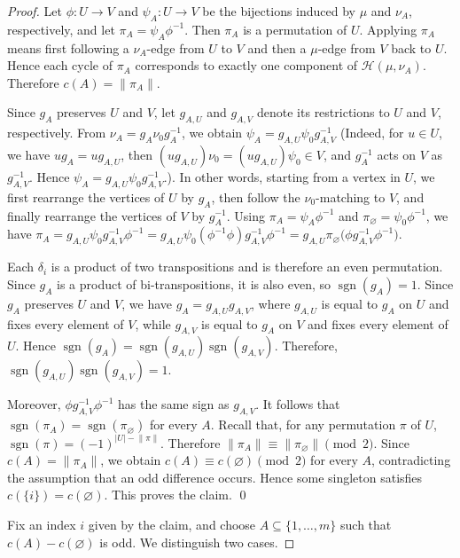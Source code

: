 \documentclass[10pt,a4paper]{amsart}
\begin{document}
\begin{proof}
Let $\phi:U\to V$ and $\psi_A:U\to V$ be the bijections induced by
$\mu$ and $\nu_A$, respectively, and let
$\pi_A=\psi_A\phi^{-1}$. Then $\pi_A$ is a permutation of $U$.
Applying $\pi_A$ means first following a $\nu_A$-edge from $U$ to
$V$ and then a $\mu$-edge from $V$ back to $U$. Hence each cycle of
$\pi_A$ corresponds to exactly one component of
$\mathcal H(\mu,\nu_A)$. Therefore
$c(A)=\lVert\pi_A\rVert$.

Since $g_A$ preserves $U$ and $V$, let $g_{A,U}$ and $g_{A,V}$ denote
its restrictions to $U$ and $V$, respectively. From
$\nu_A=g_A\nu_0g_A^{-1}$, we obtain
$\psi_A=g_{A,U}\psi_0g_{A,V}^{-1}$ (Indeed, for \(u\in U\), we have \(ug_A=ug_{A,U}\), then \((ug_{A,U})\nu_0=(ug_{A,U})\psi_0\in V\), and \(g_A^{-1}\) acts on \(V\) as \(g_{A,V}^{-1}\). Hence \(\psi_A=g_{A,U}\psi_0g_{A,V}^{-1}\).). In other words, starting from a vertex in $U$, we first rearrange the vertices of $U$ by $g_A$, then follow the $\nu_0$-matching to $V$, and finally rearrange the vertices of $V$ by $g_A^{-1}$.   Using $\pi_A=\psi_A\phi^{-1}$ and
$\pi_\varnothing=\psi_0\phi^{-1}$, we have
$\pi_A=g_{A,U}\psi_0g_{A,V}^{-1}\phi^{-1}
=g_{A,U}\psi_0(\phi^{-1}\phi)g_{A,V}^{-1}\phi^{-1}
=g_{A,U}\pi_\varnothing
\bigl(\phi g_{A,V}^{-1}\phi^{-1}\bigr)$.

Each $\delta_i$ is a product of two transpositions and is therefore an even permutation. Since $g_A$ is a product of bi-transpositions, it is also even, so $\operatorname{sgn}(g_A)=1$. Since $g_A$ preserves $U$ and $V$, we have $g_A=g_{A,U}g_{A,V}$, where $g_{A,U}$ is equal to $g_A$ on $U$ and fixes every element of $V$, while $g_{A,V}$ is equal to $g_A$ on $V$ and fixes every element of $U$. Hence
$\operatorname{sgn}(g_A)=\operatorname{sgn}(g_{A,U})\operatorname{sgn}(g_{A,V})$.
Therefore,
$\operatorname{sgn}(g_{A,U})\operatorname{sgn}(g_{A,V})=1$.


Moreover, $\phi g_{A,V}^{-1}\phi^{-1}$ has the same sign as
$g_{A,V}$. It follows that
$\operatorname{sgn}(\pi_A)=\operatorname{sgn}(\pi_\varnothing)$
for every $A$. Recall that, for any permutation $\pi$ of $U$,
$\operatorname{sgn}(\pi)=(-1)^{|U|-\lVert\pi\rVert}$.
Therefore
$\lVert\pi_A\rVert\equiv\lVert\pi_\varnothing\rVert\pmod 2$.
Since $c(A)=\lVert\pi_A\rVert$, we obtain
$c(A)\equiv c(\varnothing)\pmod 2$ for every $A$, contradicting the
assumption that an odd difference occurs. Hence some singleton
satisfies $c(\{i\})=c(\varnothing)$. This proves the claim. \qed

\medskip
Fix an index $i$ given by the claim, and choose
$A\subseteq\{1,\ldots,m\}$ such that
$c(A)-c(\varnothing)$ is odd. We distinguish two cases.


\end{proof}
\end{document}
